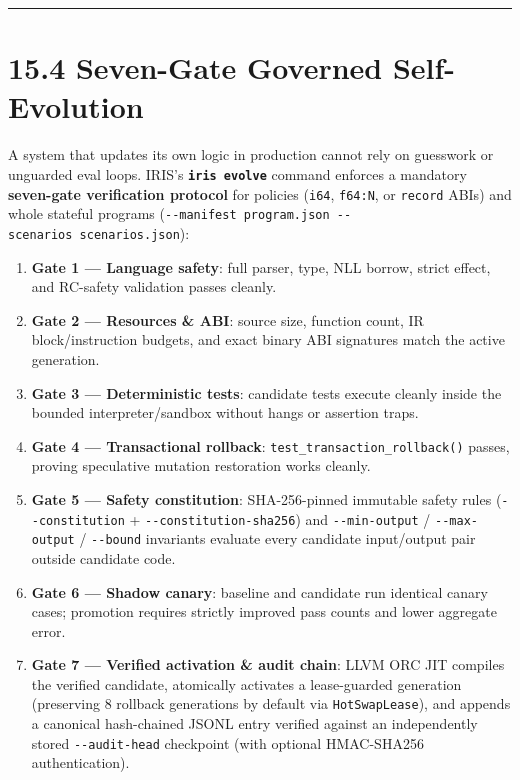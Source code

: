 \documentclass[
  english,
  oneside]{book}
\providecommand{\tightlist}{%
  \setlength{\itemsep}{0pt}\setlength{\parskip}{0pt}}
\begin{document}
\begin{center}\rule{0.5\linewidth}{0.5pt}\end{center}

\section{15.4 Seven-Gate Governed
Self-Evolution}\label{seven-gate-governed-self-evolution}

A system that updates its own logic in production cannot rely on
guesswork or unguarded eval loops. IRIS's \textbf{\texttt{iris\ evolve}}
command enforces a mandatory \textbf{seven-gate verification protocol}
for policies (\texttt{i64}, \texttt{f64:N}, or \texttt{record} ABIs) and
whole stateful programs
(\texttt{-\/-manifest\ program.json\ -\/-scenarios\ scenarios.json}):

\begin{enumerate}
\def\labelenumi{\arabic{enumi}.}
\tightlist
\item
  \textbf{Gate 1 --- Language safety}: full parser, type, NLL borrow,
  strict effect, and RC-safety validation passes cleanly.
\item
  \textbf{Gate 2 --- Resources \& ABI}: source size, function count, IR
  block/instruction budgets, and exact binary ABI signatures match the
  active generation.
\item
  \textbf{Gate 3 --- Deterministic tests}: candidate tests execute
  cleanly inside the bounded interpreter/sandbox without hangs or
  assertion traps.
\item
  \textbf{Gate 4 --- Transactional rollback}:
  \texttt{test\_transaction\_rollback()} passes, proving speculative
  mutation restoration works cleanly.
\item
  \textbf{Gate 5 --- Safety constitution}: SHA-256-pinned immutable
  safety rules (\texttt{-\/-constitution} +
  \texttt{-\/-constitution-sha256}) and \texttt{-\/-min-output} /
  \texttt{-\/-max-output} / \texttt{-\/-bound} invariants evaluate every
  candidate input/output pair outside candidate code.
\item
  \textbf{Gate 6 --- Shadow canary}: baseline and candidate run
  identical canary cases; promotion requires strictly improved pass
  counts and lower aggregate error.
\item
  \textbf{Gate 7 --- Verified activation \& audit chain}: LLVM ORC JIT
  compiles the verified candidate, atomically activates a lease-guarded
  generation (preserving 8 rollback generations by default via
  \texttt{HotSwapLease}), and appends a canonical hash-chained JSONL
  entry verified against an independently stored \texttt{-\/-audit-head}
  checkpoint (with optional HMAC-SHA256 authentication).
\end{enumerate}
\end{document}
